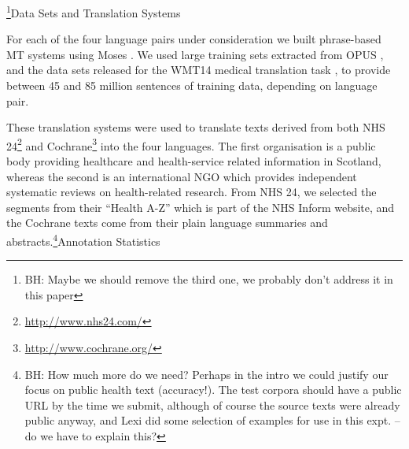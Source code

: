 \documentclass[11pt]{article}
\newcommand{\bh}[2]{\footnote{\color{blue}BH: #1}}
\begin{document}
\bh{Maybe we should remove the third one, we
probably don't address it in this paper}

\subsection{Data Sets and Translation Systems}

For each of the four language pairs under consideration  we built phrase-based MT systems
using Moses \cite{Koehn:2007}. We used large training sets extracted from OPUS \cite{tiedemann:2009}, and
the data sets released for the WMT14 medical translation task \cite{bojar-EtAl:2014:W14-33}, to provide between
45 and 85 million sentences of training data, depending on language pair.

These translation systems were used to translate texts derived from both NHS 24\footnote{\url{http://www.nhs24.com/}} and 
Cochrane\footnote{\url{http://www.cochrane.org/}} into the four languages. The first organisation is a public body
providing healthcare and health-service related information in Scotland, whereas the second is an international NGO which 
provides independent systematic reviews on health-related research. From NHS 24, we selected the segments from their
``Health A-Z'' which is part of the NHS Inform website, and the Cochrane texts come from their plain language summaries
and abstracts.\bh{How much more do we need? Perhaps in the intro we could justify our focus on public health text
(accuracy!). The test corpora should have a public URL by the time we submit, although of course the source texts were 
already public anyway, and Lexi did some selection of examples for use in this expt. -- do we have to explain this?}

\subsection{Annotation Statistics}
\end{document}
